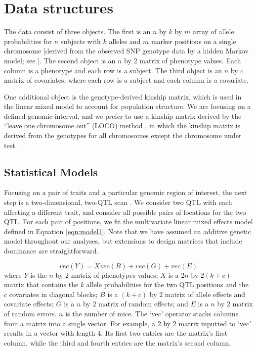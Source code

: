 \documentclass[oneside]{book}\usepackage[]{graphicx}\usepackage[]{color}
\begin{document}
\section{Data structures}

The data consist of three objects. The first is an $n$ by $k$ by $m$
array of allele probabilities for $n$ subjects with $k$ alleles and
$m$ marker positions on a single chromosome [derived from the observed
SNP genotype data by a hidden Markov model; see
\citet{broman2019rqtl2}]. The second object is an $n$ by 2 matrix of
phenotype values. Each column is a phenotype and each row is a
subject. The third object is an $n$ by $c$ matrix of covariates, where
each row is a subject and each column is a covariate.

One additional object is the genotype-derived kinship matrix, which is
used in the linear mixed model to account for population structure. We
are focusing on a defined genomic interval, and we prefer to use a
kinship matrix derived by the ``leave one chromosome out'' (LOCO)
method \citep{yang2014advantages}, in which the kinship matrix is
derived from the genotypes for all chromosomes except the chromosome
under test.




\subsection{Statistical Models}

Focusing on a pair of traits and a particular genomic region of
interest, the next step is a two-dimensional, two-QTL
scan \citep{jiang1995multiple}. We consider two QTL with each
affecting a different trait, and consider all possible pairs of
locations for the two QTL. For each pair of positions, we fit
the multivariate linear mixed effects model defined in Equation
\ref{eqn:model1}. Note that we have
assumed an additive genetic model throughout our analyses, but
extensions to design matrices that include dominance are
straightforward.


\begin{equation}
vec(Y) = X vec(B) + vec(G) + vec(E)
\label{eqn:model1}
\end{equation}
where $Y$ is the $n$ by $2$ matrix of phenotypes values;
$X$ is a $2n$ by $2(k + c)$
matrix that contains the $k$ allele probabilities for the two QTL
positions and the $c$
covariates in diagonal blocks; $B$ is a $(k + c)$ by $2$ matrix of
allele effects and covariate effects; $G$ is a $n$ by $2$ matrix of
random effects; and $E$ is a $n$ by $2$ matrix of random errors. $n$
is the number of mice. The `vec' operator stacks columns from a matrix
into a single vector. For example, a 2 by 2 matrix inputted to `vec'
results in a vector with length 4. Its first two entries are the
matrix's first column, while the third and fourth entries are the
matrix's second column.
\end{document}
